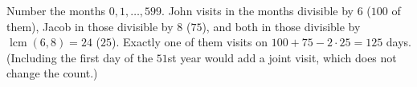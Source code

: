 Number the months $0,1,\dots,599$. John visits in the months divisible by $6$ ($100$ of them), Jacob in those divisible by $8$ ($75$), and both in those divisible by $\operatorname{lcm}(6,8)=24$ ($25$). Exactly one of them visits on $100+75-2\cdot25=\boxed{125}$ days. (Including the first day of the $51$st year would add a joint visit, which does not change the count.)
